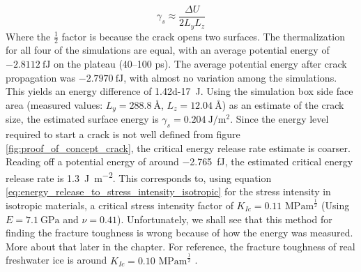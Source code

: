 \begin{equation}
	\gamma_s \approx \frac{\Delta U}{2 L_y L_z}
\end{equation}
%
Where the $\frac{1}{2}$ factor is because the crack opens two surfaces. The thermalization for all four of the simulations are equal, with an average potential energy of $\SI{-2.8112}{\femto\joule}$ on the plateau (40--100 \si{\pico\second}). The average potential energy after crack propagation was $\SI{-2.7970}{\femto\joule}$, with almost no variation among the simulations. This yields an energy difference of \SI{1.42d-17}{\joule}. Using the simulation box side face area (measured values: $L_y = \SI{288.8}{\angstrom}$, $L_z = \SI{12.04}{\angstrom}$) as an estimate of the crack size, the estimated surface energy is $\gamma_s = \SI{0.204}{\joule\per\meter\squared}$. Since the energy level required to start a crack is not well defined from figure \ref{fig:proof_of_concept_crack}, the critical energy release rate estimate is coarser. Reading off a potential energy of around \SI{-2.765}{\femto\joule}, the estimated critical energy release rate is \SI{1.3}{\joule\per\meter\squared}. This corresponds to, using equation \ref{eq:energy_release_to_stress_intensity_isotropic} for the stress intensity in isotropic materials, a critical stress intensity factor of $K_{Ic} = 0.11 \text{ MPam}^{\frac{1}{2}}$ (Using $E=\SI{7.1}{\giga\pascal}$ and $\nu = 0.41$). Unfortunately, we shall see that this method for finding the fracture toughness is wrong because of how the energy was measured. More about that later in the chapter. For reference, the fracture toughness of real freshwater ice is around $K_{Ic} = 0.10 \text{ MPam}^{\frac{1}{2}}$ \cite{benham1996mechanics}. 

